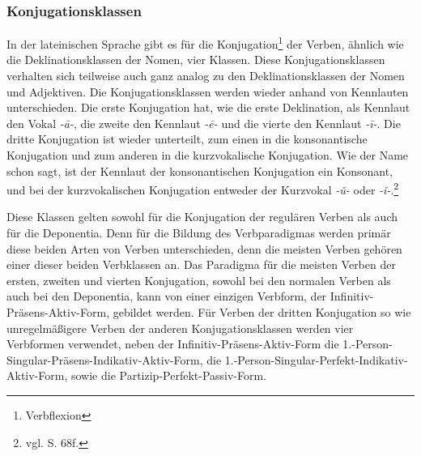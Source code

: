 \subsubsection{Konjugationsklassen}
In der lateinischen Sprache gibt es für die Konjugation\footnote{Verbflexion} der Verben, ähnlich wie die Deklinationsklassen der Nomen, vier Klassen. Diese Konjugationsklassen verhalten sich teilweise auch ganz analog zu den Deklinationsklassen der Nomen und Adjektiven. Die Konjugationsklassen werden wieder anhand von Kennlauten unterschieden. Die erste Konjugation hat, wie die erste Deklination, als Kennlaut den Vokal \textit{-ā-}, die zweite den Kennlaut \textit{-ē-} und die vierte den Kennlaut \textit{-ī-}. Die dritte Konjugation ist wieder unterteilt, zum einen in die konsonantische Konjugation und zum anderen in die kurzvokalische Konjugation. Wie der Name schon sagt, ist der Kennlaut der konsonantischen Konjugation ein Konsonant, und bei der kurzvokalischen Konjugation entweder der Kurzvokal \textit{-ǔ-} oder \textit{-ǐ-}.\footnote{vgl. \cite{BAYER-LINDAUER1994} S. 68f.} \par
Diese Klassen gelten sowohl für die Konjugation der regulären Verben als auch für die Deponentia. Denn für die Bildung des Verbparadigmas werden primär diese beiden Arten von Verben unterschieden, denn die meisten Verben gehören einer dieser beiden Verbklassen an. Das Paradigma für die meisten Verben der ersten, zweiten und vierten Konjugation, sowohl bei den normalen Verben als auch bei den Deponentia, kann von einer einzigen Verbform, der Infinitiv-Präsens-Aktiv-Form, gebildet werden. Für Verben der dritten Konjugation so wie unregelmäßigere Verben der anderen Konjugationsklassen werden vier Verbformen verwendet, neben der Infinitiv-Präsens-Aktiv-Form die 1.-Person-Singular-Präsens-Indikativ-Aktiv-Form, die 1.-Person-Singular-Perfekt-Indikativ-Aktiv-Form, sowie die Par\-ti\-zip-Per\-fekt-Pas\-siv-Form.  \par
